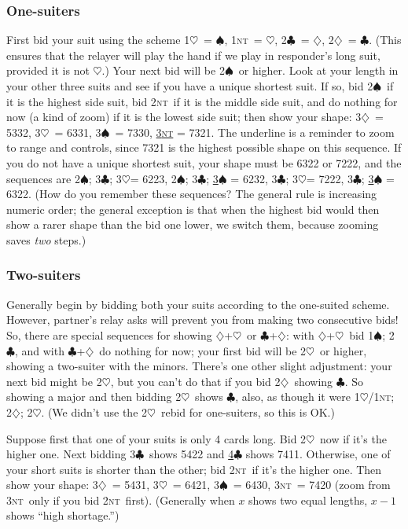 \documentclass{amsart}
\renewcommand{\c}{\ensuremath{\clubsuit}}
\renewcommand{\d}{\ensuremath{\diamondsuit}}
\newcommand{\h}{\ensuremath{\heartsuit}}
\newcommand{\s}{\ensuremath{\spadesuit}}
\newcommand{\nt}{\textsc{nt}}
\newcommand{\+}{\ensuremath{^+}}
\newcommand{\zoom}{\underline}
\begin{document}
\subsubsection*{One-suiters}
First bid your suit using the scheme 1\h\ = \s, 1\nt\ = \h, 2\c\ = \d,
2\d\ = \c.  (This ensures that the relayer will play the hand if we
play in responder's long suit, provided it is not \h.)  Your next bid
will be 2\s\ or higher.  Look at your length in your other three suits
and see if you have a unique shortest suit.  If so, bid 2\s\ if it is
the highest side suit, bid 2\nt\ if it is the middle side suit, and do
nothing for now (a kind of zoom) if it is the lowest side suit; then
show your shape: 3\d\ = 5332, 3\h\ = 6331, 3\s\ = 7330, \zoom{3\nt} =
7321.  The underline is a reminder to zoom to range and controls,
since 7321 is the highest possible shape on this sequence.  If you do
not have a unique shortest suit, your shape must be 6322 or 7222, and
the sequences are 2\s; 3\c; 3\h = 6223, 2\s; 3\c; \zoom{3\s} = 6232,
3\c; 3\h = 7222, 3\c; \zoom{3\s} = 6322.  (How do you remember these
sequences?  The general rule is increasing numeric order; the general
exception is that when the highest bid would then show a rarer shape
than the bid one lower, we switch them, because zooming saves
\emph{two} steps.)

\subsubsection*{Two-suiters}
Generally begin by bidding both your suits according to the one-suited
scheme.  However, partner's relay asks will prevent you from making
two consecutive bids!  So, there are special sequences for showing
\d+\h\ or \c+\d: with \d+\h\ bid 1\s; 2\c, and with \c+\d\ do nothing
for now; your first bid will be 2\h\ or higher, showing a two-suiter
with the minors.  There's one other slight adjustment: your next bid
might be 2\h, but you can't do that if you bid 2\d\ showing \c.  So
showing a major and then bidding 2\h\ shows \c, also, as though it
were 1\h/1\nt; 2\d; 2\h.  (We didn't use the 2\h\ rebid for
one-suiters, so this is OK.)

Suppose first that one of your suits is only 4 cards long.  Bid
2\h\ now if it's the higher one.  Next bidding 3\c\ shows 5422 and
\zoom{4\c} shows 7411.  Otherwise, one of your short suits is shorter
than the other; bid 2\nt\ if it's the higher one.  Then show your
shape: 3\d\ = 5431, 3\h\ = 6421, 3\s\ = 6430, 3\nt\ = 7420 (zoom from
3\nt\ only if you bid 2\nt\ first).  (Generally when $x$ shows two
equal lengths, $x-1$ shows ``high shortage.'')
\end{document}
